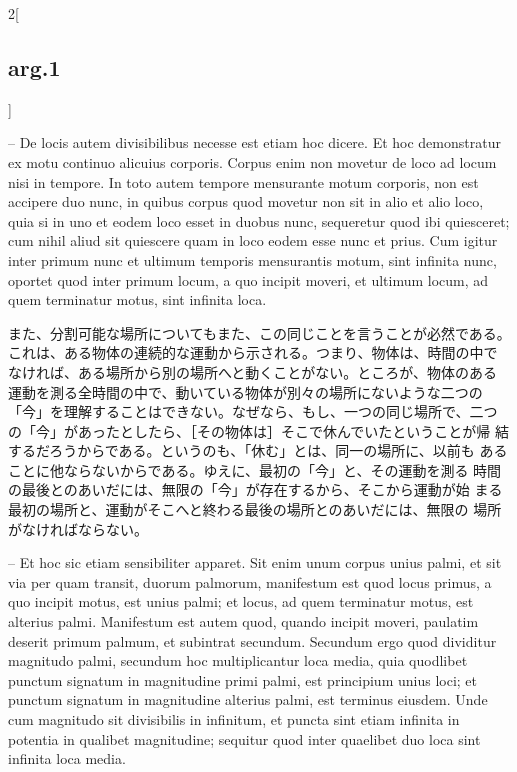 \documentclass[paper=a4paper,fontsize=10pt,jafontsize=9pt,titlepage]{jlreq}
\begin{document}
\begin{paracol}{2}[\subsection{arg.1}]
\switchcolumn*

-- De locis autem divisibilibus necesse est etiam hoc
dicere. Et hoc demonstratur ex motu continuo alicuius corporis. Corpus
enim non movetur de loco ad locum nisi in tempore. In toto autem tempore
mensurante motum corporis, non est accipere duo nunc, in quibus corpus
quod movetur non sit in alio et alio loco, quia si in uno et eodem loco
esset in duobus nunc, sequeretur quod ibi quiesceret; cum nihil aliud
sit quiescere quam in loco eodem esse nunc et prius. Cum igitur inter
primum nunc et ultimum temporis mensurantis motum, sint infinita nunc,
oportet quod inter primum locum, a quo incipit moveri, et ultimum locum,
ad quem terminatur motus, sint infinita loca.

\switchcolumn

また、分割可能な場所についてもまた、この同じことを言うことが必然である。
 これは、ある物体の連続的な運動から示される。つまり、物体は、時間の中で
 なければ、ある場所から別の場所へと動くことがない。ところが、物体のある
 運動を測る全時間の中で、動いている物体が別々の場所にないような二つの
 「今」を理解することはできない。なぜなら、もし、一つの同じ場所で、二つ
 の「今」があったとしたら、［その物体は］そこで休んでいたということが帰
 結するだろうからである。というのも、「休む」とは、同一の場所に、以前も
 あることに他ならないからである。ゆえに、最初の「今」と、その運動を測る
 時間の最後とのあいだには、無限の「今」が存在するから、そこから運動が始
 まる最初の場所と、運動がそこへと終わる最後の場所とのあいだには、無限の
 場所がなければならない。

\switchcolumn*

-- Et hoc sic etiam
sensibiliter apparet. Sit enim unum corpus unius palmi, et sit via per
quam transit, duorum palmorum, manifestum est quod locus primus, a quo
incipit motus, est unius palmi; et locus, ad quem terminatur motus, est
alterius palmi. Manifestum est autem quod, quando incipit moveri,
paulatim deserit primum palmum, et subintrat secundum. Secundum ergo
quod dividitur magnitudo palmi, secundum hoc multiplicantur loca media,
quia quodlibet punctum signatum in magnitudine primi palmi, est
principium unius loci; et punctum signatum in magnitudine alterius
palmi, est terminus eiusdem. Unde cum magnitudo sit divisibilis in
infinitum, et puncta sint etiam infinita in potentia in qualibet
magnitudine; sequitur quod inter quaelibet duo loca sint infinita loca
media.

\switchcolumn


\end{paracol}
\end{document}

